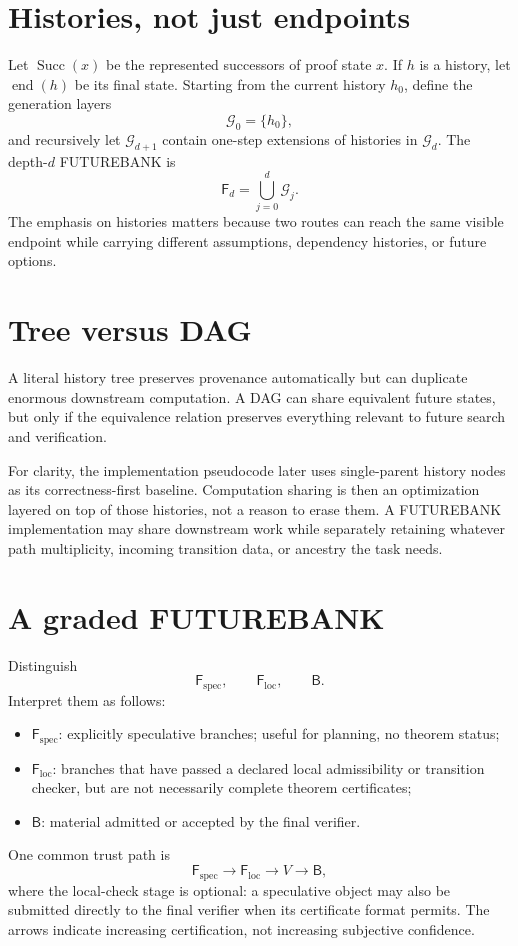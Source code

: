 \documentclass[11pt,openany]{book}
\theoremstyle{definition}
\theoremstyle{remark}
\newcommand{\Bank}{\mathsf{B}}
\newcommand{\Future}{\mathsf{F}}
\newcommand{\Spec}{\Future_{\mathrm{spec}}}
\newcommand{\Loc}{\Future_{\mathrm{loc}}}
\begin{document}
\section{Histories, not just endpoints}
Let $\operatorname{Succ}(x)$ be the represented successors of proof state $x$. If $h$ is a history, let $\operatorname{end}(h)$ be its final state. Starting from the current history $h_0$, define the generation layers
\[
\mathcal G_0=\{h_0\},
\]
and recursively let $\mathcal G_{d+1}$ contain one-step extensions of histories in $\mathcal G_d$. The depth-$d$ FUTUREBANK is
\[
\Future_d=\bigcup_{j=0}^{d}\mathcal G_j.
\]
The emphasis on histories matters because two routes can reach the same visible endpoint while carrying different assumptions, dependency histories, or future options.

\section{Tree versus DAG}
A literal history tree preserves provenance automatically but can duplicate enormous downstream computation. A DAG can share equivalent future states, but only if the equivalence relation preserves everything relevant to future search and verification.

For clarity, the implementation pseudocode later uses single-parent history nodes as its correctness-first baseline. Computation sharing is then an optimization layered on top of those histories, not a reason to erase them. A FUTUREBANK implementation may share downstream work while separately retaining whatever path multiplicity, incoming transition data, or ancestry the task needs.

\section{A graded FUTUREBANK}
Distinguish
\[
\Spec,\qquad \Loc,\qquad \Bank.
\]
Interpret them as follows:
\begin{itemize}
\item $\Spec$: explicitly speculative branches; useful for planning, no theorem status;
\item $\Loc$: branches that have passed a declared local admissibility or transition checker, but are not necessarily complete theorem certificates;
\item $\Bank$: material admitted or accepted by the final verifier.
\end{itemize}
One common trust path is
\[
\Spec\longrightarrow\Loc\longrightarrow V\longrightarrow\Bank,
\]
where the local-check stage is optional: a speculative object may also be submitted directly to the final verifier when its certificate format permits. The arrows indicate increasing certification, not increasing subjective confidence.
\end{document}
